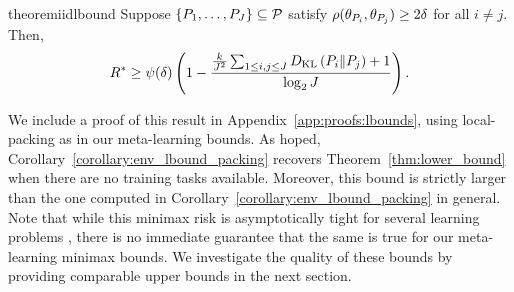 \begin{restatable}{theorem}{iidlbound}\label{thm:lower_bound}
Suppose $\{P_1,\dots,P_J\} \subseteq \mathcal{P}$ satisfy $\rho(\theta_{P_i}, \theta_{P_j}) \geq 2\delta$ for all $i\neq j$. Then,
\begin{align*}
R^* \geq \psi(\delta)\left(1 - \dfrac{\frac{k}{J^2}\sum_{1 \leq i,j \leq J}D_{\mathrm{KL}}\left(P_i\Vert P_j\right) + 1}{\log_2 J}\right).
\end{align*}
\end{restatable}

We include a proof of this result in Appendix~\ref{app:proofs:lbounds}, using local-packing as in our meta-learning bounds. As hoped, Corollary~\ref{corollary:env_lbound_packing} recovers Theorem~\ref{thm:lower_bound} when there are no training tasks available. Moreover, this \iid bound is strictly larger than the one computed in Corollary~\ref{corollary:env_lbound_packing} in general. Note that while this \iid minimax risk is asymptotically tight for several learning problems \citep{loh2017lower, raskutti2011minimax}, there is no immediate guarantee that the same is true for our meta-learning minimax bounds. We investigate the quality of these bounds by providing comparable upper bounds in the next section.
